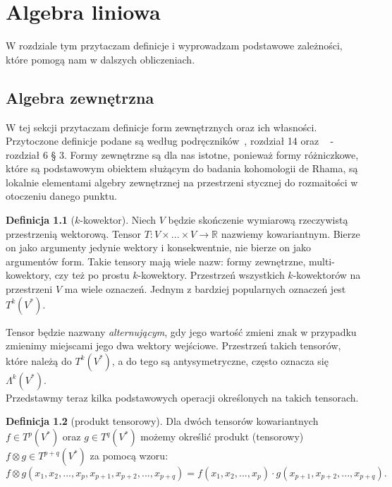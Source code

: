 \documentclass[licencjacka]{pracamgr}
\theoremstyle{definition}
\newtheorem{definition}{Definicja}[section]
\theoremstyle{definition}
\theoremstyle{plain}
\theoremstyle{plain}
\theoremstyle{plain}
\theoremstyle{plain}
\begin{document}
\chapter{Algebra liniowa}
W rozdziale tym przytaczam definicje i wyprowadzam podstawowe zależności, które
pomogą nam w dalszych obliczeniach. \\

\section{Algebra zewnętrzna}\label{exterior-algebra-chapter}
W tej sekcji przytaczam definicje form zewnętrznych oraz ich własności. 
 Przytoczone
definicje podane są według podręczników~\cite{lee}, rozdział 14 oraz
~\cite{kostrikin} - rozdział 6 § 3. 
Formy zewnętrzne są dla nas istotne, ponieważ formy różniczkowe, które 
są podstawowym obiektem służącym do badania kohomologii de Rhama, 
są lokalnie elementami algebry zewnętrznej na przestrzeni stycznej
do rozmaitości w otoczeniu danego punktu. \\

\begin{definition}[$k$-kowektor]
Niech $V$ będzie skończenie wymiarową rzeczywistą przestrzenią wektorową.
Tensor $T:V \times ... \times V \rightarrow \mathbb{R}$ nazwiemy kowariantnym.
Bierze on jako argumenty jedynie wektory i konsekwentnie, nie bierze on jako
argumentów form.  Takie tensory mają wiele nazw: formy zewnętrzne,
multi-kowektory, czy też po prostu $k$-kowektory.  Przestrzeń wszystkich
$k$-kowektorów na przestrzeni $V$ ma wiele oznaczeń.  Jednym z bardziej
popularnych oznaczeń jest $T^k (V^\ast)$. \\
\end{definition}

Tensor będzie nazwany \emph{alternującym}, gdy jego wartość zmieni znak w
przypadku zmienimy miejscami jego dwa wektory wejściowe.  Przestrzeń takich
tensorów, które należą do $T^k (V^\ast)$, a do tego są antysymetryczne, często
oznacza się $\Lambda^k (V^\ast)$. \\

Przedstawmy teraz kilka podstawowych operacji określonych na takich tensorach.

\begin{definition}[produkt tensorowy]
Dla dwóch tensorów kowariantnych $f \in T^p(V^\ast) $ oraz $g \in T^q(V^\ast) $
możemy określić produkt (tensorowy) $f \otimes g \in T^{p+q}(V^\ast) $ za
pomocą wzoru:
\[
  f \otimes g(x_1, x_2, ..., x_p, x_{p+1}, x_{p+2}, ... ,x_{p+q}) =
  f(x_1, x_2, ... , x_p) \cdot g(x_{p+1}, x_{p+2}, ... , x_{p+q}).
\] \\
\end{definition}
\end{document}
